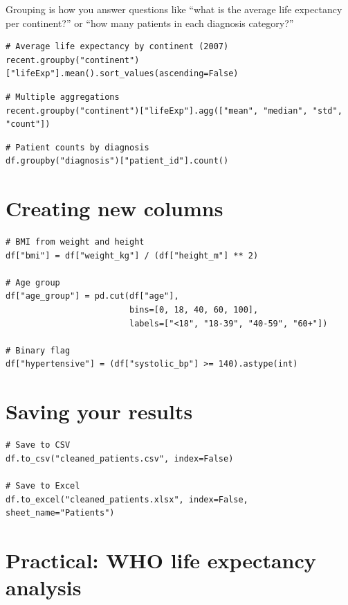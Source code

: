 Grouping is how you answer questions like ``what is the average life expectancy per continent?'' or ``how many patients in each diagnosis category?''

\begin{verbatim}
# Average life expectancy by continent (2007)
recent.groupby("continent")["lifeExp"].mean().sort_values(ascending=False)
\end{verbatim}

\begin{verbatim}
# Multiple aggregations
recent.groupby("continent")["lifeExp"].agg(["mean", "median", "std", "count"])
\end{verbatim}

\begin{verbatim}
# Patient counts by diagnosis
df.groupby("diagnosis")["patient_id"].count()
\end{verbatim}

\section{Creating new columns}

\begin{verbatim}
# BMI from weight and height
df["bmi"] = df["weight_kg"] / (df["height_m"] ** 2)

# Age group
df["age_group"] = pd.cut(df["age"],
                         bins=[0, 18, 40, 60, 100],
                         labels=["<18", "18-39", "40-59", "60+"])

# Binary flag
df["hypertensive"] = (df["systolic_bp"] >= 140).astype(int)
\end{verbatim}

\section{Saving your results}

\begin{verbatim}
# Save to CSV
df.to_csv("cleaned_patients.csv", index=False)

# Save to Excel
df.to_excel("cleaned_patients.xlsx", index=False, sheet_name="Patients")
\end{verbatim}

\section{Practical: WHO life expectancy analysis}

